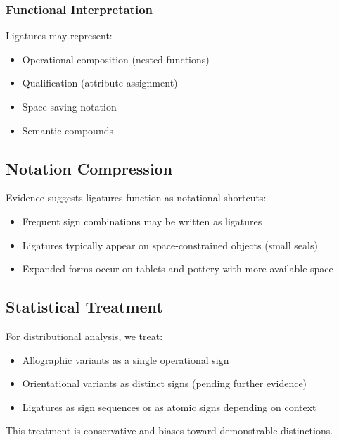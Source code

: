 \subsubsection{Functional Interpretation}
Ligatures may represent:
\begin{itemize}
    \item Operational composition (nested functions)
    \item Qualification (attribute assignment)
    \item Space-saving notation
    \item Semantic compounds
\end{itemize}

\subsection{Notation Compression}

Evidence suggests ligatures function as notational shortcuts:
\begin{itemize}
    \item Frequent sign combinations may be written as ligatures
    \item Ligatures typically appear on space-constrained objects (small seals)
    \item Expanded forms occur on tablets and pottery with more available space
\end{itemize}

\subsection{Statistical Treatment}

For distributional analysis, we treat:
\begin{itemize}
    \item Allographic variants as a single operational sign
    \item Orientational variants as distinct signs (pending further evidence)
    \item Ligatures as sign sequences or as atomic signs depending on context
\end{itemize}

This treatment is conservative and biases toward demonstrable distinctions.
